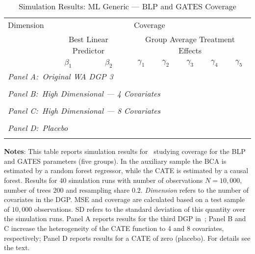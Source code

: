 \documentclass[11pt, a4paper, leqno]{article}
\begin{document}
\begin{table}
    \caption{Simulation Results: ML Generic --- BLP and GATES Coverage}
    \begin{threeparttable}
        \center
        \begin{tabular}{lccccccc}
            Dimension & \multicolumn{7}{c}{Coverage} \\
            & \multicolumn{2}{c}{Best Linear Predictor} & \multicolumn{5}{c}{Group Average Treatment Effects} \\
            & $\beta_1$ & $\beta_2$ & $\gamma_1$ & $\gamma_2$ & $\gamma_3$ & $\gamma_4$ & $\gamma_5$ \\
            \toprule
            \multicolumn{8}{l}{\textit{Panel A:\ Original WA DGP 3}} \\
             \\
            \midrule

            \multicolumn{8}{l}{\textit{Panel B:\ High Dimensional --- 4 Covariates}} \\
             \\
            \midrule

            \multicolumn{8}{l}{\textit{Panel C:\ High Dimensional --- 8 Covariates}} \\
             \\
            \midrule

            \multicolumn{8}{l}{\textit{Panel D:\ Placebo}} \\
             \\
            \bottomrule
        \end{tabular}

        \begin{tablenotes}
            \small
            \item \textbf{Notes}: This table reports simulation results for~\cite{chernozhukov2023genml} studying coverage for the BLP and GATES parameters (five groups).
            In the auxiliary sample the BCA is estimated by a random forest regressor, while the CATE is estimated by a causal forest.
            Results for $40$ simulation runs with number of observations $N=10,000$, number of trees $200$ and resampling share $0.2$.
            \textit{Dimension} refers to the number of covariates in the DGP\@.
            MSE and coverage are calculated based on a test sample of $10,000$ observations. SD refers to the standard deviation of this quantity over the simulation runs.
            Panel A reports results for the third DGP in~\cite{wager2018estimation}; Panel B and C increase the heterogeneity of the CATE function to 4 and 8 covariates, respectively; Panel D reports results for a CATE of zero (placebo).
            For details see the text.
        \end{tablenotes}
    \end{threeparttable}
\end{table}
\end{document}
